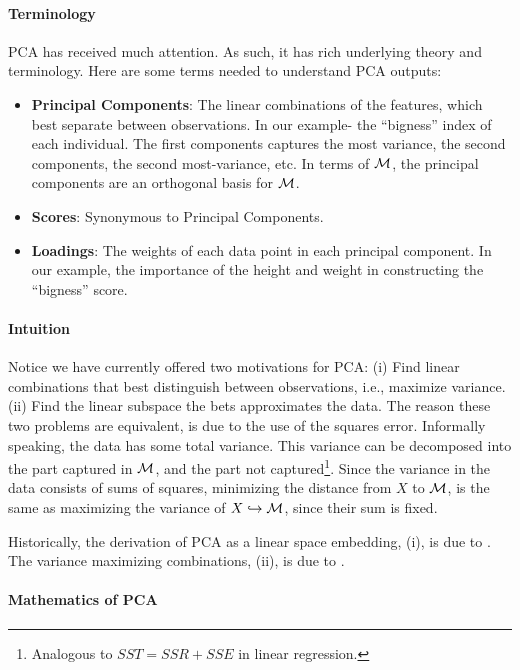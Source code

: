 \paragraph{Terminology}
PCA has received much attention. As such, it has rich underlying theory and terminology.
Here are some terms needed to understand PCA outputs:
\begin{itemize}
\item \textbf{Principal Components}:  The linear combinations of the features, which best separate between observations. In our example- the ``bigness'' index of each individual. The first components captures the most variance, the second components, the second most-variance, etc. In terms of $\mathcal{M}$, the principal components are an orthogonal basis for $\mathcal{M}$.
\item \textbf{Scores}: Synonymous to Principal Components.
\item \textbf{Loadings}: The weights of each data point in each principal component. In our example, the importance of the height and weight in constructing the ``bigness'' score.
\end{itemize}


\paragraph{Intuition}
Notice we have currently offered two motivations for PCA: 
(i) Find linear combinations that best distinguish between observations, i.e., maximize variance. 
(ii) Find the linear subspace the bets approximates the data.
The reason these two problems are equivalent, is due to the use of the squares error.
Informally speaking, the data has some total variance. This variance can be decomposed into the part captured in $\mathcal{M}$, and the part not captured\footnote{Analogous to $SST=SSR+SSE$ in linear regression.}. 
Since the variance in the data consists of sums of squares, minimizing the distance from $X$ to $\mathcal{M}$, is the same as maximizing the variance of $X \hookrightarrow \mathcal{M}$, since their sum is fixed.

Historically, the derivation of PCA as a linear space embedding, (i), is due to \cite{pearson_liii._1901}. 
The variance maximizing combinations, (ii), is due to \cite{hotelling_analysis_1933}.


\paragraph{Mathematics of PCA}

